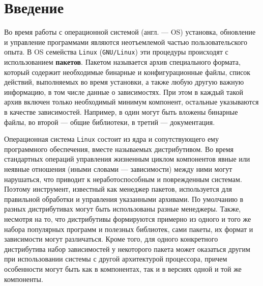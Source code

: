 
\section*{Введение}
\label{sec:intro}

Во время работы с операционной системой (англ. --- OS) установка, обновление и управление программами являются неотъемлемой частью пользовательского опыта.
В OS семейства \texttt{Linux} (\texttt{GNU/Linux}) эти процедуры происходят с использованием \textbf{пакетов}.
Пакетом называется архив специального формата, который содержит необходимые бинарные и конфигурационные файлы, список действий, выполняемых во время установки, а также любую другую важную информацию, в том числе данные о зависимостях.
При этом в каждый такой архив включен только необходимый минимум компонент, остальные указываются в качестве зависимостей.
Например, в один могут быть вложены бинарные файлы, во второй --- общие библиотеки, в третий --- документация.

Операционная система \texttt{Linux} состоит из ядра и сопутствующего ему программного обеспечения, вместе называемых дистрибутивом.
Во время стандартных операций управления жизненным циклом компонентов явные или неявные отношения (иными словами --- зависимости) между ними могут нарушаться, что приводит к неработоспособным и поврежденным системам.
Поэтому инструмент, известный как менеджер пакетов, используется для правильной обработки и управления указанными архивами.
По умолчанию в разных дистрибутивах могут быть использованы разные менеджеры.
Также, несмотря на то, что дистрибутивы формируются примерно из одного и того же набора популярных программ и полезных библиотек, сами пакеты, их формат и зависимости могут различаться.
Кроме того, для одного конкретного дистрибутива набор зависимостей у некоторого пакета может оказаться другим при использовании системы с другой архитектурой процессора, причем особенности могут быть как в компонентах, так и в версиях одной и той же компоненты.

